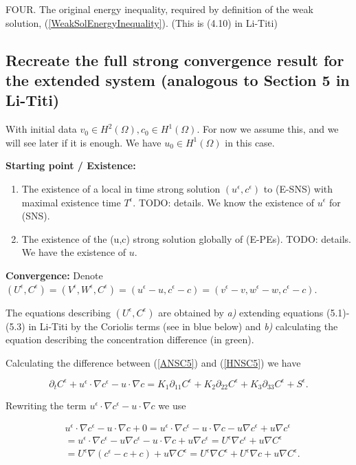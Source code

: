 \documentclass[11pt]{article}
\begin{document}
FOUR. The original energy inequality, required by definition of the weak solution, (\ref{WeakSolEnergyInequality}). (This is (4.10) in Li-Titi)

\subsection{Recreate the full strong convergence result for the extended system (analogous to Section 5 in Li-Titi)}

With initial data $v_0 \in H^2 (\Omega), c_0 \in H^1(\Omega).$ For now we assume this, and we will see later if it is enough. We have $u_0 \in H^1(\Omega)$ in this case.
  
\textbf{Starting point / Existence:}

\begin{enumerate}
  \item The existence of a local in time strong solution $(u^\epsilon, c^\epsilon)$ to (E-SNS) with maximal existence time $T^\epsilon.$ TODO: details. We know the existence of $u^\epsilon$ for (SNS).
  \item The existence of the (u,c) strong solution globally of (E-PEs). TODO: details. We have the existence of $u.$
\end{enumerate}
  
\textbf{Convergence:}  
Denote $(U^\epsilon, C^\epsilon) = (V^\epsilon, W^\epsilon, C^\epsilon) = (u^\epsilon - u, c^\epsilon - c) = (v^\epsilon - v, w^\epsilon - w, c^\epsilon - c).$

The equations describing $(U^\epsilon, C^\epsilon)$ are obtained by \textit{a)} extending equations (5.1)-(5.3) in Li-Titi by the Coriolis terms (see in blue below) and \textit{b)} calculating the equation describing the concentration difference (in green).

Calculating the difference between (\ref{ANSC5}) and (\ref{HNSC5}) we have

$$ \partial_t C^\epsilon + u^\epsilon \cdot \nabla c^\epsilon - u \cdot \nabla c = K_1 \partial_{11} C^\epsilon + K_2 \partial_{22} C^\epsilon + K_3 \partial_{33} C^\epsilon + S^\epsilon.$$

Rewriting the term $u^\epsilon \cdot \nabla c^\epsilon - u \cdot \nabla c$ we use

\begin{equation}
  \begin{split}
    & u^\epsilon \cdot \nabla c^\epsilon - u \cdot \nabla c + 0 = u^\epsilon \cdot \nabla c^\epsilon - u \cdot \nabla c - u \nabla c^\epsilon + u \nabla c^\epsilon \\
    & = u^\epsilon \cdot \nabla c^\epsilon - u \nabla c^\epsilon - u \cdot \nabla c + u \nabla c^\epsilon = U^\epsilon \nabla c^\epsilon + u \nabla C^\epsilon \\
    & = U^\epsilon \nabla (c^\epsilon - c + c) + u \nabla C^\epsilon = U^\epsilon \nabla C^\epsilon  + U^\epsilon \nabla c+ u \nabla C^\epsilon.
  \end{split}
\end{equation}
\end{document}

